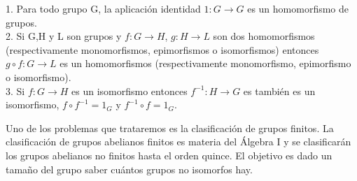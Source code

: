 \begin{nprop}
1. Para todo grupo G, la aplicación identidad $1:G \rightarrow G$ es un homomorfismo de grupos. \\
2. Si G,H y L son grupos y $f:G \rightarrow H$, $g:H \rightarrow L$ son dos homomorfismos (respectivamente monomorfismos, epimorfismos o isomorfismos) entonces $g \circ f:G \rightarrow L$ es un homomorfismos (respectivamente monomorfismo, epimorfismo o isomorfismo). \\
3. Si $f:G \rightarrow H$ es un isomorfismo entonces $f^{-1}:H \rightarrow G$ es también es un isomorfismo, $f \circ f^{-1} = 1_G$ y  $f^{-1} \circ f = 1_G$.
\end{nprop}

Uno de los problemas que trataremos es la clasificación de grupos finitos. La clasificación de grupos abelianos finitos es materia del Álgebra I y se clasificarán los grupos abelianos no finitos hasta el orden quince. El objetivo es dado un tamaño del grupo saber cuántos grupos no isomorfos hay.
